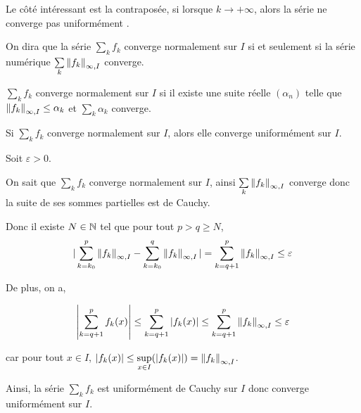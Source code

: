 \documentclass[a4paper,12pt]{article}
\begin{document}
\begin{remarque}
    Le côté intéressant est la contraposée, si  lorsque $k \to +\infty$, alors la série ne converge pas uniformément .
\end{remarque}

\begin{definition}
    On dira que la série $\sum\limits_k f_k$ converge normalement sur $I$ si et seulement si
    la série numérique $\sum\limits_k \left\lVert f_k\right\rVert_{\infty, I}$ converge.
\end{definition}

\begin{methode}
    $\sum\limits_k f_k$ converge normalement sur $I$ si il existe une suite réelle $(\alpha_n)$ telle que
    $\left\lVert f_k\right\rVert_{\infty, I} \leq \alpha_k$ et $\sum\limits_k \alpha_k$ converge.
\end{methode}

\begin{theoreme}{}{}
    Si $\sum\limits_k f_k$ converge normalement sur $I$, alors elle converge uniformément sur $I$.
\end{theoreme}

\begin{demonstration}
    Soit $\varepsilon > 0$.

    On sait que $\sum\limits_k f_k$ converge normalement sur $I$, ainsi $\sum\limits_k \left\lVert f_k\right\rVert_{\infty, I}$ converge donc la suite de ses sommes partielles est de Cauchy.
    
    Donc il existe $N \in \mathbb{N}$ tel que pour tout $p > q \geq N$,
    $$
    |\sum\limits_{k=k_0}^p \left\lVert f_k\right\rVert_{\infty, I} - \sum\limits_{k=k_0}^q \left\lVert f_k\right\rVert_{\infty, I}| = \sum\limits_{k=q+1}^p \left\lVert f_k\right\rVert_{\infty, I} \leq \varepsilon
    $$

    De plus, on a,

    $$
    \left| \sum_{k=q+1}^p f_k(x) \right| \leq \sum_{k=q+1}^p |f_k(x)| \leq \sum_{k=q+1}^p \left\lVert f_k\right\rVert_{\infty, I} \leq \varepsilon
    $$

    car pour tout $x \in I$, $|f_k(x)| \leq \sup\limits_{x \in I}(|f_k(x)|) = \left\lVert f_k\right\rVert_{\infty, I}$.

    Ainsi, la série $\sum\limits_k f_k$ est uniformément de Cauchy sur $I$ donc converge uniformément sur $I$.
\end{demonstration}
\end{document}
